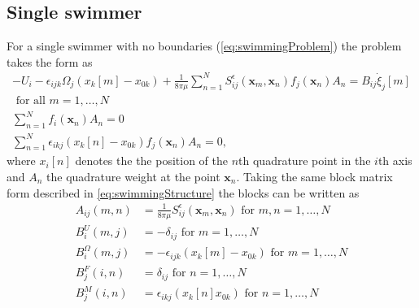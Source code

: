 \subsection{Single swimmer}
For a single swimmer with no boundaries (\cref{eq:swimmingProblem}) the problem takes the form as 
\begin{equation*}
\begin{gathered}
    -U_{i}-\epsilon_{i j k} \Omega_{j}\left(x_k[{m}]-x_{0 k}\right)+\frac{1}{8 \pi\mu} \sum_{n=1}^N S_{i j}^{\epsilon}(\bm{x}_m, \bm{x}_n) f_{j}(\bm{x}_n) A_n =  B_{i j} \dot{\xi}_{j}[m] \\ \text { for all } m = 1,\dots,N\\
    \sum_{n=1}^N f_{i}(\bm{x}_n) A_n=0 \\
    \sum_{n=1}^N \epsilon_{i k j} (x_{k}[n]-x_{0 k}) f_{j}(\bm{x}_n) A_n=0,
\end{gathered}
\end{equation*}
where $x_{i}[n]$ denotes the the position of the $n$th quadrature point in the $i$th axis and $A_n$ the quadrature weight at the point $\bm{x}_n$. Taking the same block matrix form described in \cref{eq:swimmingStructure} the blocks can be written as
\begin{equation*}
\begin{aligned}
A_{ij}(m,n) &= \frac{1}{8\pi\mu} S_{ij}^\epsilon (\bm{x}_m,\bm{x}_{n}) \text { for } m,n = 1,\dots,N \\
B_{i}^{U}(m,j) &= -\delta_{ij} \text { for } m = 1,\dots,N \\
B_{i}^{\Omega}(m,j) &= -\epsilon_{ijk}(x_k[m]-x_{0k}) \text { for } m = 1,\dots,N \\
B_{j}^{F}(i,n) &= \delta_{ij} \text { for } n = 1,\dots,N \\
B_{j}^{M}(i,n) &= \epsilon_{ikj} (x_k[n]x_{0 k}) \text { for } n = 1,\dots,N
\end{aligned}
\end{equation*}

